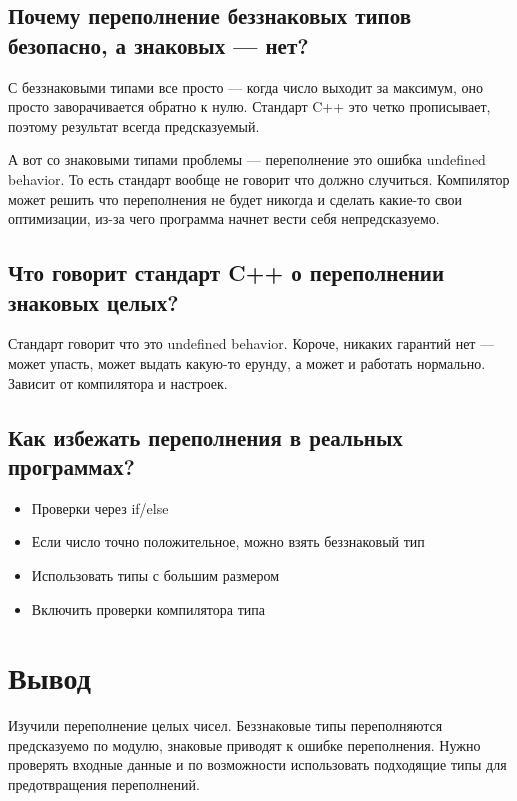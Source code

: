 \documentclass[12pt,a4paper]{article}
\begin{document}
    \subsection*{Почему переполнение беззнаковых типов безопасно, а знаковых — нет?}

    С беззнаковыми типами все просто — когда число выходит за максимум, оно просто заворачивается обратно к нулю. Стандарт C++ это четко прописывает, поэтому результат всегда предсказуемый.

    А вот со знаковыми типами проблемы — переполнение это ошибка undefined behavior. То есть стандарт вообще не говорит что должно случиться. Компилятор может решить что переполнения не будет никогда и сделать какие-то свои оптимизации, из-за чего программа начнет вести себя непредсказуемо.

    \subsection*{Что говорит стандарт C++ о переполнении знаковых целых?}

    Стандарт говорит что это undefined behavior. Короче, никаких гарантий нет — может упасть, может выдать какую-то ерунду, а может и работать нормально. Зависит от компилятора и настроек.

    \subsection*{Как избежать переполнения в реальных программах?}

    \begin{itemize}
        \item Проверки через if/else
        \item Если число точно положительное, можно взять беззнаковый тип
        \item Использовать типы с большим размером
        \item Включить проверки компилятора типа
    \end{itemize}

    \section*{Вывод}

    Изучили переполнение целых чисел. Беззнаковые типы переполняются предсказуемо по модулю, знаковые приводят к ошибке переполнения. Нужно проверять входные данные и по возможности использовать подходящие типы для предотвращения переполнений.
\end{document}
